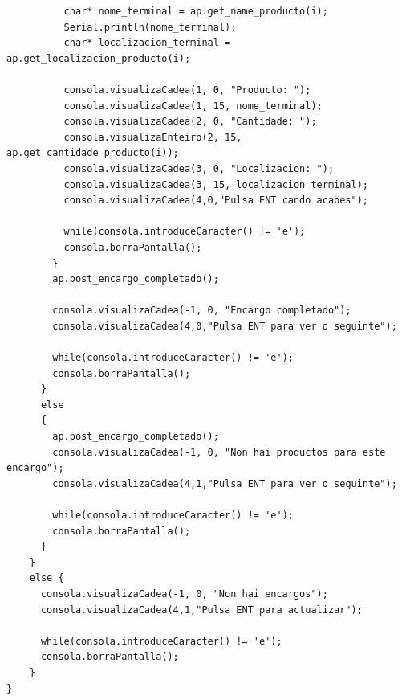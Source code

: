 \documentclass[11pt,twoside]{book}
\begin{document}
\begin{lstlisting}
          char* nome_terminal = ap.get_name_producto(i);
          Serial.println(nome_terminal);
          char* localizacion_terminal = ap.get_localizacion_producto(i);

          consola.visualizaCadea(1, 0, "Producto: ");
          consola.visualizaCadea(1, 15, nome_terminal);
          consola.visualizaCadea(2, 0, "Cantidade: ");
          consola.visualizaEnteiro(2, 15, ap.get_cantidade_producto(i));
          consola.visualizaCadea(3, 0, "Localizacion: ");
          consola.visualizaCadea(3, 15, localizacion_terminal);
          consola.visualizaCadea(4,0,"Pulsa ENT cando acabes");

          while(consola.introduceCaracter() != 'e');
          consola.borraPantalla();
        }
        ap.post_encargo_completado();

        consola.visualizaCadea(-1, 0, "Encargo completado");
        consola.visualizaCadea(4,0,"Pulsa ENT para ver o seguinte");

        while(consola.introduceCaracter() != 'e');
        consola.borraPantalla();
      }
      else
      {
        ap.post_encargo_completado();
        consola.visualizaCadea(-1, 0, "Non hai productos para este encargo");
        consola.visualizaCadea(4,1,"Pulsa ENT para ver o seguinte");

        while(consola.introduceCaracter() != 'e');
        consola.borraPantalla();
      }
    }
    else {
      consola.visualizaCadea(-1, 0, "Non hai encargos");
      consola.visualizaCadea(4,1,"Pulsa ENT para actualizar");

      while(consola.introduceCaracter() != 'e');
      consola.borraPantalla();
    }
}

\end{lstlisting}

\stopcontents[parts]

\cleardoublepage

\renewcommand{\documento}{Prego de condicións}
\end{document}
